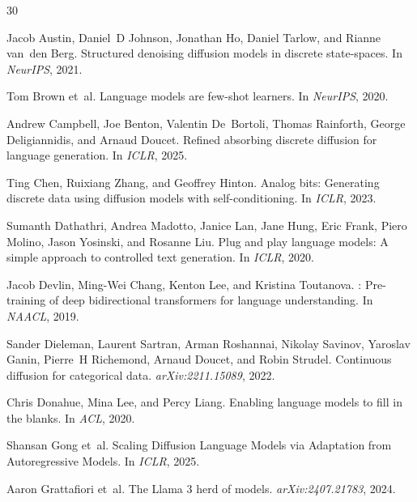 \documentclass{article}
\begin{document}
\begin{thebibliography}{30}

Jacob Austin, Daniel~D Johnson, Jonathan Ho, Daniel Tarlow, and Rianne van~den Berg.
\newblock Structured denoising diffusion models in discrete state-spaces.
\newblock In \emph{NeurIPS}, 2021.

Tom Brown et~al.
\newblock Language models are few-shot learners.
\newblock In \emph{NeurIPS}, 2020.

Andrew Campbell, Joe Benton, Valentin De~Bortoli, Thomas Rainforth, George Deligiannidis, and Arnaud Doucet.
\newblock Refined absorbing discrete diffusion for language generation.
\newblock In \emph{ICLR}, 2025.

Ting Chen, Ruixiang Zhang, and Geoffrey Hinton.
\newblock Analog bits: Generating discrete data using diffusion models with self-conditioning.
\newblock In \emph{ICLR}, 2023.

Sumanth Dathathri, Andrea Madotto, Janice Lan, Jane Hung, Eric Frank, Piero Molino, Jason Yosinski, and Rosanne Liu.
\newblock Plug and play language models: A simple approach to controlled text generation.
\newblock In \emph{ICLR}, 2020.

Jacob Devlin, Ming-Wei Chang, Kenton Lee, and Kristina Toutanova.
: Pre-training of deep bidirectional transformers for language understanding.
\newblock In \emph{NAACL}, 2019.

Sander Dieleman, Laurent Sartran, Arman Roshannai, Nikolay Savinov, Yaroslav Ganin, Pierre~H Richemond, Arnaud Doucet, and Robin Strudel.
\newblock Continuous diffusion for categorical data.
\newblock \emph{arXiv:2211.15089}, 2022.

Chris Donahue, Mina Lee, and Percy Liang.
\newblock Enabling language models to fill in the blanks.
\newblock In \emph{ACL}, 2020.

Shansan Gong et~al.
\newblock Scaling Diffusion Language Models via Adaptation from Autoregressive Models.
\newblock In \emph{ICLR}, 2025.

Aaron Grattafiori et~al.
\newblock The {Llama} 3 herd of models.
\newblock \emph{arXiv:2407.21783}, 2024.


\end{thebibliography}
\end{document}
